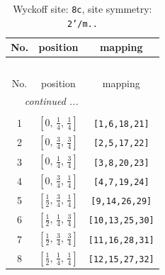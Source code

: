 \documentclass[fleqn,8pt]{jsarticle}
\begin{document}
\renewcommand{\arraystretch}{1.2}
\begin{longtable}{ccc}
\caption{Wyckoff site: {\tt 8c}, site symmetry: {\tt 2'/m..}}
 \\
 \hline \hline
No. & position & mapping \\ \hline \endfirsthead

\multicolumn{2}{l}{\tablename\ \thetable{}} \\
 \hline \hline
No. & position & mapping \\ \hline \endhead

 \hline \hline
\multicolumn{2}{r}{\footnotesize\it continued ...} \\ \endfoot

 \hline \hline
\multicolumn{2}{r}{} \\ \endlastfoot

1 & $\left[ 0,\, \frac{1}{4},\, \frac{1}{4} \right]$ & {\tt [1,6,18,21]} \\ \hline
2 & $\left[ 0,\, \frac{3}{4},\, \frac{3}{4} \right]$ & {\tt [2,5,17,22]} \\ \hline
3 & $\left[ 0,\, \frac{1}{4},\, \frac{3}{4} \right]$ & {\tt [3,8,20,23]} \\ \hline
4 & $\left[ 0,\, \frac{3}{4},\, \frac{1}{4} \right]$ & {\tt [4,7,19,24]} \\ \hline
5 & $\left[ \frac{1}{2},\, \frac{3}{4},\, \frac{1}{4} \right]$ & {\tt [9,14,26,29]} \\ \hline
6 & $\left[ \frac{1}{2},\, \frac{1}{4},\, \frac{3}{4} \right]$ & {\tt [10,13,25,30]} \\ \hline
7 & $\left[ \frac{1}{2},\, \frac{3}{4},\, \frac{3}{4} \right]$ & {\tt [11,16,28,31]} \\ \hline
8 & $\left[ \frac{1}{2},\, \frac{1}{4},\, \frac{1}{4} \right]$ & {\tt [12,15,27,32]} \\
\end{longtable}
\renewcommand{\arraystretch}{1.2}
\end{document}
